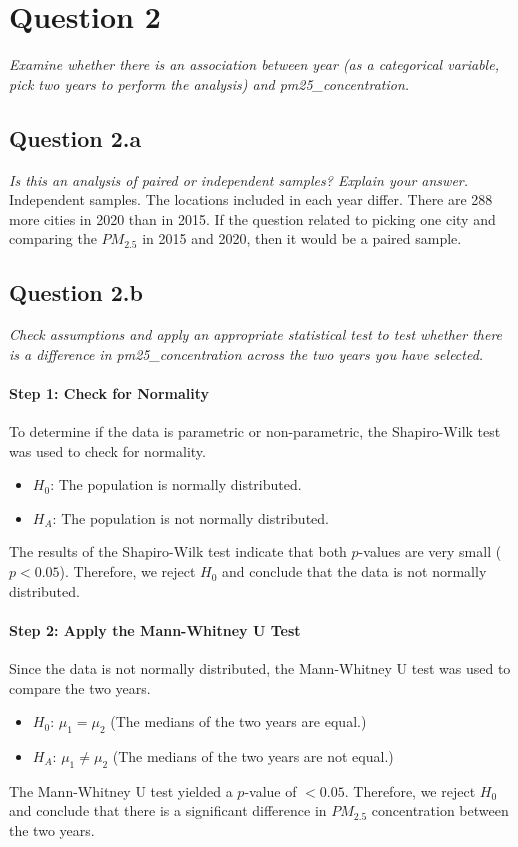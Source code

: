 \section[Question 2]{Question 2}
\textit{Examine whether there is an association between year (as a categorical variable, pick
two years to perform the analysis) and pm25\_concentration.}

\subsection{Question 2.a}
\textit{Is this an analysis of paired or independent samples? Explain your answer.}\\

\noindent Independent samples. The locations included in each year differ. There are 288 more cities in 2020 than in 2015. If the question related to picking one city and comparing the $PM_{2.5}$ in 2015 and 2020, then it would be a paired sample.



\subsection{Question 2.b}
\textit{Check assumptions and apply an appropriate statistical test to test whether
there is a difference in pm25\_concentration across the two years you have
selected.}

\paragraph*{Step 1: Check for Normality}
To determine if the data is parametric or non-parametric, the Shapiro-Wilk test was used to check for normality.

\begin{itemize}
    \item $H_0$: The population is normally distributed.
    \item $H_A$: The population is not normally distributed.
\end{itemize}

The results of the Shapiro-Wilk test indicate that both $p$-values are very small ($p < 0.05$). Therefore, we reject $H_0$ and conclude that the data is not normally distributed.

\paragraph*{Step 2: Apply the Mann-Whitney U Test}
Since the data is not normally distributed, the Mann-Whitney U test was used to compare the two years.

\begin{itemize}
    \item $H_0$: $\mu_1 = \mu_2$ (The medians of the two years are equal.)
    \item $H_A$: $\mu_1 \neq \mu_2$ (The medians of the two years are not equal.)
\end{itemize}

The Mann-Whitney U test yielded a $p$-value of $< 0.05$. Therefore, we reject $H_0$ and conclude that there is a significant difference in $PM_{2.5}$ concentration between the two years.


\newpage
